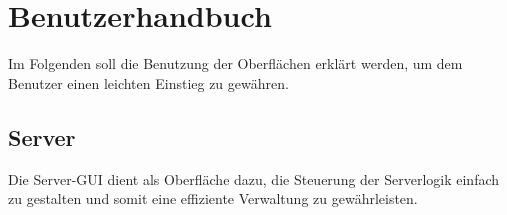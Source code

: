 \documentclass[12pt,a4paper,bibliography=totocnumbered,listof=totocnumbered]{scrartcl}
\begin{document}
\newpage
\section{Benutzerhandbuch}
Im Folgenden soll die Benutzung der Oberflächen erklärt werden, um dem Benutzer einen leichten Einstieg zu gewähren.
\subsection{Server}
Die Server-GUI dient als Oberfläche dazu, die Steuerung der Serverlogik einfach zu gestalten und somit eine effiziente Verwaltung zu gewährleisten.

\vspace{1em}
\begin{minipage}{\linewidth}
	\centering
\end{minipage}
\vspace{0.5em}
\end{document}

